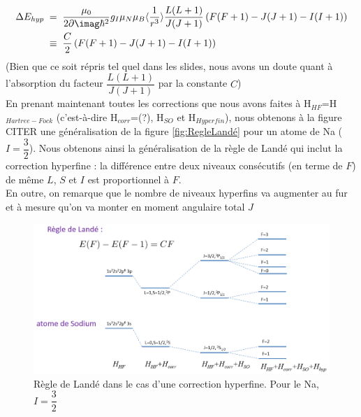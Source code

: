 \begin{align*}
    \Delta E_{hyp} &\eq  \dfrac{\mu_0}{2\p\imag\hbar^2}g_I\mu_N\mu_B\langle\dfrac{1}{r^3}\rangle\dfrac{L(L+1)}{J(J+1)}\left( F(F+1) - J(J+1) - I(I+1) \right)\\
    &\;\equiv\;
    \dfrac{C}{2} \left( F(F+1) - J(J+1) - I(I+1) \right)
\end{align*}
(Bien que ce soit répris tel quel dans les slides, nous avons un doute quant à l'absorption du facteur $\dfrac{L(L+1)}{J(J+1)}$ par la constante $C$)\\

En prenant maintenant toutes les corrections que nous avons faites à H$_{HF}$=H$_{Hartree-Fock}$ (c'est-à-dire H$_{corr}$=(?), H$_{SO}$ et H$_{Hyperfin}$), nous obtenons à la figure CITER une généralisation de la figure \ref{fig:RegleLandé} pour un atome de Na ($I=\dfrac{3}{2}$). Nous obtenons ainsi la généralisation de la règle de Landé qui inclut la correction hyperfine : la différence entre deux niveaux consécutifs (en terme de $F$) de même $L$, $S$ et $I$ est proportionnel à $F$.\\
En outre, on remarque que le nombre de niveaux hyperfins va augmenter au fur et à mesure qu'on va monter en moment angulaire total $J$
\begin{figure}[tph]
    \centering
    \includegraphics[scale=0.8]{Images2/règle_Landé2.png}
    \caption{Règle de Landé dans le cas d'une correction hyperfine. Pour le Na, $I=\dfrac{3}{2}$}
    \label{fig:règle_landé2}
\end{figure}

\vspace{1cm}

